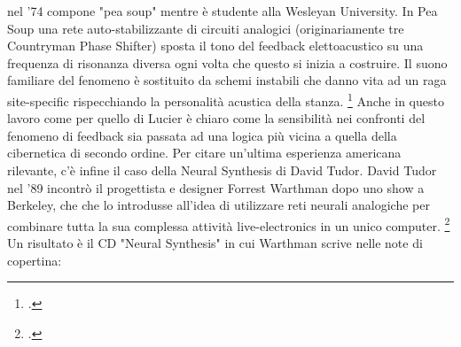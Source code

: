 nel '74 compone "pea soup" mentre è studente alla Wesleyan University.
In Pea Soup una rete auto-stabilizzante di circuiti analogici
(originariamente tre Countryman Phase Shifter)
sposta il tono del feedback elettoacustico su una frequenza di risonanza
diversa ogni volta che questo si inizia a
costruire. Il suono familiare del fenomeno è sostituito da schemi instabili
che danno vita ad un raga site-specific
rispecchiando la personalità acustica della stanza. \footcite{collinspeasouphist}
Anche in questo lavoro come per quello di Lucier è chiaro come la sensibilità
nei confronti del fenomeno di feedback sia passata ad una logica più vicina
a quella della cibernetica di secondo ordine.
Per citare un'ultima esperienza americana rilevante,
c'è infine il caso della Neural Synthesis di David Tudor.
David Tudor nel '89 incontrò il progettista e designer Forrest Warthman
dopo uno show a Berkeley,
che che lo introdusse all'idea di utilizzare reti neurali analogiche
per combinare tutta la sua complessa attività live-electronics in un unico computer.
\footcite{tudorneuralsynth}
Un risultato è il CD "Neural Synthesis" in cui Warthman scrive nelle note di copertina:

